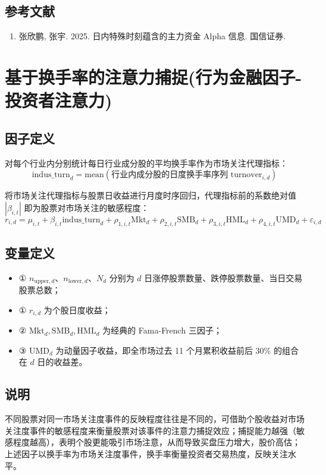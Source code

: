 \documentclass{article}
\begin{document}
\subsection{参考文献}
\begin{enumerate}
    \item 张欣鹏, 张宇. 2025. 日内特殊时刻蕴含的主力资金 Alpha 信息. 国信证券.
\end{enumerate}

\section{基于换手率的注意力捕捉(行为金融因子-投资者注意力)}

\subsection{因子定义}
对每个行业内分别统计每日行业成分股的平均换手率作为市场关注代理指标：
\begin{equation}
    \mathrm{indus\_turn}_d = \mathrm{mean}(\text{行业内成分股的日度换手率序列 } \mathrm{turnover}_{i,d})
\end{equation}

将市场关注代理指标与股票日收益进行月度时序回归，代理指标前的系数绝对值 \(|\beta_{i,t}|\) 即为股票对市场关注的敏感程度：
\begin{equation}
    r_{i,d} = \mu_{i,t} + \beta_{i,t} \mathrm{indus\_turn}_d + \rho_{1,i,t} \mathrm{Mkt}_d + \rho_{2,i,t} \mathrm{SMB}_d + \rho_{3,i,t} \mathrm{HML}_d + \rho_{4,i,t} \mathrm{UMD}_d + \varepsilon_{i,d}
\end{equation}

\subsection{变量定义}
\begin{itemize}
    \item ① \(n_{\mathrm{upper},d}\)、\(n_{\mathrm{lower},d}\)、\(N_d\) 分别为 \(d\) 日涨停股票数量、跌停股票数量、当日交易股票总数；
    \item ① \( r_{i,d} \) 为个股日度收益；
    \item ② \( \mathrm{Mkt}_d, \mathrm{SMB}_d, \mathrm{HML}_d \) 为经典的 Fama-French 三因子；
    \item ③ \( \mathrm{UMD}_d \) 为动量因子收益，即全市场过去 11 个月累积收益前后 30\% 的组合在 \( d \) 日的收益差。
\end{itemize}

\subsection{说明}
不同股票对同一市场关注度事件的反映程度往往是不同的，可借助个股收益对市场关注度事件的敏感程度来衡量股票对该事件的注意力捕捉效应；捕捉能力越强（敏感程度越高），表明个股更能吸引市场注意，从而导致买盘压力增大，股价高估；上述因子以换手率为市场关注度事件，换手率衡量投资者交易热度，反映关注水平。
\end{document}
